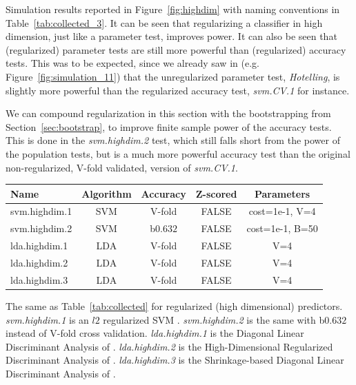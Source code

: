 \documentclass[12pt,a4paper]{article}
\theoremstyle{definition}
\begin{document}
Simulation results reported in Figure~\ref{fig:highdim} with naming conventions in Table~\ref{tab:collected_3}.
It can be seen that regularizing a classifier in high dimension, just like a parameter test, improves power. 
It can also be seen that (regularized) parameter tests are still more powerful than (regularized) accuracy tests. 
This was to be expected, since we already saw in (e.g. Figure~\ref{fig:simulation_11}) that the unregularized parameter test, \emph{Hotelling}, is slightly more powerful than the regularized accuracy test, \emph{svm.CV.1} for instance.

We can compound regularization in this section with the bootstrapping from Section~\ref{sec:bootstrap}, to improve finite sample power of the accuracy tests. 
This is done in the \emph{svm.highdim.2} test, which still falls short from the power of the population tests, but is a much more powerful accuracy test than the original non-regularized, V-fold validated, version of \emph{svm.CV.1}.

\bigskip

\begin{tcolorbox}
\centering
\begin{tabular}{l|c|c|c|c}
Name & Algorithm & Accuracy & Z-scored & Parameters\\ 
\hline
\hline
svm.highdim.1 & SVM & V-fold & FALSE & cost=1e-1, V=4 \\ 
svm.highdim.2 & SVM & b$0.632$ & FALSE & cost=1e-1, B=50 \\ 
lda.highdim.1 & LDA & V-fold & FALSE & V=4 \\ 
lda.highdim.2 & LDA & V-fold & FALSE & V=4 \\ 
lda.highdim.3 & LDA & V-fold & FALSE & V=4 \\ 
\end{tabular} 
\captionsetup{type=table}
\caption{
The same as Table~\ref{tab:collected} for regularized (high dimensional) predictors. 
\emph{svm.highdim.1} is an $l2$ regularized SVM \cite{friedman_regularization_2010}. 
\emph{svm.highdim.2} is the same with b$0.632$ instead of V-fold cross validation. 
\emph{lda.highdim.1} is the Diagonal Linear Discriminant Analysis of \cite{dudoit_comparison_2002}.
\emph{lda.highdim.2} is the High-Dimensional Regularized Discriminant Analysis of \cite{ramey_high-dimensional_2016}.
\emph{lda.highdim.3} is the Shrinkage-based Diagonal Linear Discriminant Analysis of \cite{pang_shrinkage-based_2009}.
} 
\label{tab:collected_3}
\end{tcolorbox}
\end{document}
